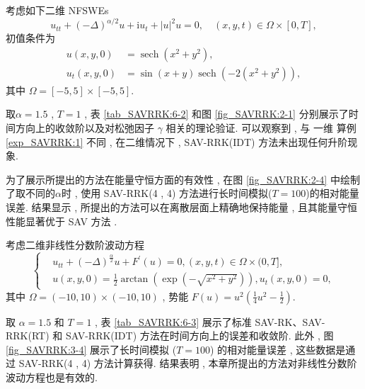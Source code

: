 	\begin{example}\label{exp_SAVRRK:2}
		考虑如下二维 NFSWEs
\begin{equation}
	u_{t t}+(-\Delta)^{\alpha / 2} u+\mathrm{i}  u_{t}+|u|^{2} u=0 , \quad (x , y , t) \in \Omega \times[0 , T],
\end{equation}
初值条件为
\begin{equation}
	\begin{aligned}
		u(x , y , 0)&=\operatorname{sech}\left(x^2+y^2\right) , \\
		u_t(x , y , 0)&=\sin (x+y) \operatorname{sech}\left(-2\left(x^2+y^2\right)\right)  , 
	\end{aligned}
\end{equation}
其中 $\Omega=[-5 , 5] \times[-5 , 5]$.
	\end{example}
			
		取$\alpha=1.5$ , $T=1$ , 表 \ref{tab_SAVRRK:6-2} 和图 \ref{fig_SAVRRK:2-1} 分别展示了时间方向上的收敛阶以及对松弛因子 $\gamma$ 相关的理论验证.
		可以观察到 , 与 一维 算例 \ref{exp_SAVRRK:1} 不同 , 在二维情况下 , SAV-RRK(IDT) 方法未出现任何升阶现象.

		为了展示所提出的方法在能量守恒方面的有效性 , 在图 \ref{fig_SAVRRK:2-4} 中绘制了取不同的$\alpha$时 , 使用 SAV-RRK(4 , 4) 方法进行长时间模拟($T=100$)的相对能量误差.
		结果显示 , 所提出的方法可以在离散层面上精确地保持能量 , 且其能量守恒性能显著优于 SAV 方法 \cite{chengConvergenceEnergyconservingScheme2022}.
		
	


	
	\begin{example}\label{exp_SAVRRK:3}
		考虑二维非线性分数阶波动方程\cite{wangUnconditionalEnergyDissipation2021} 
		\begin{equation}
		\begin{cases}
		& u_{t t}+(-\Delta)^{\frac{\alpha}{2}} u+F^{\prime}(u)=0 , (x , y , t) \in \Omega \times(0 , T] , \\
		& u(x , y , 0)=\frac{1}{2} \arctan \left(\exp \left(-\sqrt{x^2+y^2}\right)\right) , u_t(x , y , 0)=0 , 
		\end{cases}
		\end{equation}
		其中 $\Omega=(-10 , 10) \times(-10 , 10)$ , 势能 $F(u)=u^2\left(\frac{1}{4} u^2-\frac{1}{2}\right)$.
		\end{example}
		
		取 $\alpha=1.5$ 和 $T=1$ , 表 \ref{tab_SAVRRK:6-3} 展示了标准 SAV-RK、SAV-RRK(RT) 和 SAV-RRK(IDT) 方法在时间方向上的误差和收敛阶.
		此外 , 图 \ref{fig_SAVRRK:3-4} 展示了长时间模拟 ($T=100$) 的相对能量误差 , 这些数据是通过 SAV-RRK(4 , 4) 方法计算获得.
		结果表明 , 本章所提出的方法对非线性分数阶波动方程也是有效的.


